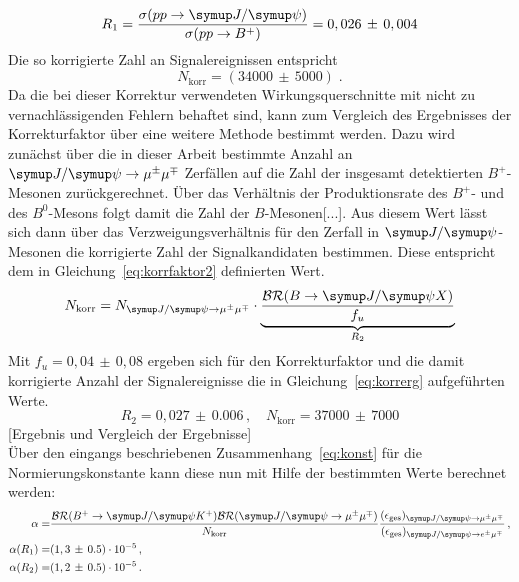 %
\begin{equation}
  R_1=\frac{\sigma(pp\rightarrow\jpsi)}{\sigma(pp\rightarrow B^+)}=0,026\,\pm\,0,004
  \label{eq:korrfaktor}
\end{equation}
%
Die so korrigierte Zahl an Signalereignissen entspricht
%
\begin{equation}
  N_\text{korr}=(34000\,\pm\,5000)\; .
\end{equation}
%
Da die bei dieser Korrektur verwendeten Wirkungsquerschnitte mit nicht zu vernachlässigenden Fehlern behaftet sind, kann
zum Vergleich des Ergebnisses der Korrekturfaktor über eine weitere Methode bestimmt werden. Dazu wird zunächst über die in
dieser Arbeit bestimmte Anzahl an $\kontroll$ Zerfällen auf die Zahl der insgesamt detektierten $B^{+}$-Mesonen zurückgerechnet. Über das Verhältnis der Produktionsrate des $B^{+}$- und des $B^{0}$-Mesons folgt damit die Zahl der
$B$-Mesonen[...]. Aus diesem Wert lässt sich dann über das Verzweigungsverhältnis für den Zerfall in $\jpsi$-Mesonen die korrigierte Zahl der Signalkandidaten bestimmen. Diese entspricht dem in Gleichung~\eqref{eq:korrfaktor2} definierten Wert.
%
\begin{equation}
  N_\text{korr}=N_{\kontroll}\cdot\underbrace{\frac{\mathcal{BR}(B\rightarrow\jpsi X)}{f_u}}_{R_2}
  \label{eq:korrfaktor2}
\end{equation}
%
Mit $f_u=0,04\,\pm\,0,08$ \cite{pdg} ergeben sich für den Korrekturfaktor und die damit korrigierte Anzahl der Signalereignisse die in Gleichung~\ref{eq:korrerg} aufgeführten Werte.
%
\begin{equation}
  R_2=0,027\,\pm\,0.006\, , \quad N_\text{korr}=37000\,\pm\,7000
  \label{eq:korrerg}
\end{equation}
%
[Ergebnis und Vergleich der Ergebnisse]\\
Über den eingangs beschriebenen Zusammenhang~\eqref{eq:konst} für die Normierungskonstante kann diese nun mit Hilfe der bestimmten Werte berechnet werden:
%
\begin{align*}
  \alpha=&\frac{\mathcal{BR}(B^{+}\rightarrow\jpsi K^{+})\mathcal{BR}(\kontroll)}{N_\text{korr}}\frac{(\epsilon_{\text{ges}})_{\kontroll}}{(\epsilon_{\text{ges}})_{\signal}}\, , \\
  \alpha(R_1)=&(1,3\,\pm\,0.5)\cdot10^{-5} \, , \\
  \alpha(R_2)=&(1,2\,\pm\,0.5)\cdot10^{-5} \, .
\end{align*}
